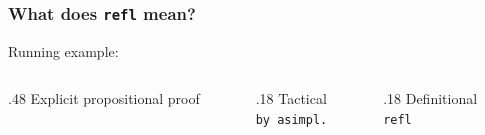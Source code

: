 \documentclass[pdftex,aspectratio=169]{beamer}
\newcommand{\refl}{\texttt{refl}}
\newcommand{\Blob}{\ensuremath{\bullet}}
\newcommand{\Wk}{\ensuremath{\mathord{\uparrow}}}
\begin{document}


\begin{frame}
  \frametitle{What does \refl{} mean?}
  Running example:
  \IntroductionStatement
  \vspace{5ex}
  \begin{columns}[c,onlytextwidth]
    \begin{column}{.48\textwidth}
      Explicit propositional proof
      \tiny
      \IntroductionProof
    \end{column}
    \begin{column}{.18\textwidth}
      Tactical\\
      \texttt{by asimpl.}
      \vspace{21ex}
    \end{column}
    \begin{column}{.18\textwidth}
      Definitional\\
      \refl{}
      \vspace{21ex}
    \end{column}
  \end{columns}
\end{frame}
\end{document}
